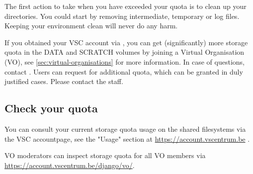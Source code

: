\begin{tip}
The first action to take when you have exceeded your quota is
to clean up your directories. You could start by removing intermediate,
temporary or log files.  Keeping your environment clean will never do any harm.
\end{tip}

\begin{tip}
\ifgent
If you obtained your VSC account via \university, you can get
(significantly) more storage quota in the DATA and SCRATCH volumes
by joining a Virtual Organisation (VO),
see \autoref{sec:virtual-organisations} for more information.
In case of questions, contact \hpcinfo.
\else
Users can request for additional quota, which can be granted in
duly justified cases. Please contact the \hpcTeam staff.
\fi
\end{tip}

\subsection{Check your quota}




\ifgent
You can consult your current storage quota usage
on the \hpcInfra shared filesystems via the VSC accountpage,
see the "Usage" section at \url{https://account.vscentrum.be} .

VO moderators can inspect storage quota for all VO members via\\
\url{https://account.vscentrum.be/django/vo/}.

